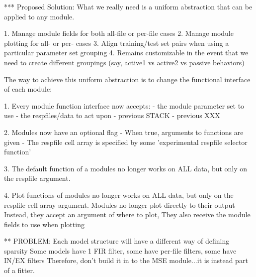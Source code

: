 *** Proposed Solution:
    What we really need is a uniform abstraction that can be applied to any module.

    1. Manage module fields for both all-file or per-file cases
    2. Manage module plotting for all- or per- cases
    3. Align training/test set pairs when using a particular parameter set grouping
    4. Remains customizable in the event that we need to create different groupings (say, active1 vs active2 vs passive behaviors) 

    The way to achieve this uniform abstraction is to change the functional interface of each module:

    1. Every module function interface now accepts:
       - the module parameter set to use
       - the respfiles/data to act upon
       - previous STACK
       - previous XXX

    2. Modules now have an optional flag
       - When true, arguments to functions are given
       - The respfile cell array is specified by some 'experimental respfile selector function'

    3. The default function of a modules no longer works on ALL data, but only on the respfile argument.

    4. Plot functions of modules no longer works on ALL data, but only on the respfile cell array argument.
       Modules no longer plot directly to their output
       Instead, they accept an argument of where to plot, 
       They also receive the module fields to use when plotting

** PROBLEM: Each model structure will have a different way of defining sparsity
     Some models have 1 FIR filter, some have per-file filters, some have IN/EX filters
  Therefore, don't build it in to the MSE module...it is instead part of a fitter.
  
